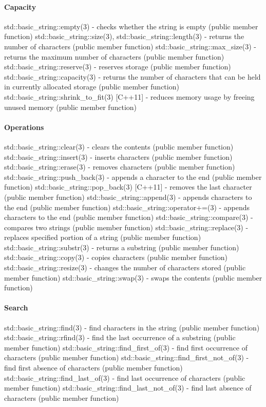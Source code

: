 \paragraph{Capacity}
std::basic\_string::empty(3) - checks whether the string is empty   (public member function)
std::basic\_string::size(3), std::basic\_string::length(3) - returns the number of characters   (public member function)
std::basic\_string::max\_size(3) - returns the maximum number of characters   (public member function)
std::basic\_string::reserve(3) - reserves storage   (public member function)
std::basic\_string::capacity(3) - returns the number of characters that can be held in currently allocated storage   (public member function)
std::basic\_string::shrink\_to\_fit(3) [C++11] - reduces memory usage by freeing unused memory   (public member function)
\paragraph{Operations}
std::basic\_string::clear(3) - clears the contents  (public member function)
std::basic\_string::insert(3) - inserts characters  (public member function)
std::basic\_string::erase(3) - removes characters   (public member function)
std::basic\_string::push\_back(3) - appends a character to the end  (public member function)
std::basic\_string::pop\_back(3) [C++11] - removes the last character   (public member function)
std::basic\_string::append(3) - appends characters to the end  (public member function)
std::basic\_string::operator+=(3) - appends characters to the end  (public member function)
std::basic\_string::compare(3) - compares two strings  (public member function)
std::basic\_string::replace(3) - replaces specified portion of a string  (public member function)
std::basic\_string::substr(3) - returns a substring  (public member function)
std::basic\_string::copy(3) - copies characters  (public member function)
std::basic\_string::resize(3) - changes the number of characters stored   (public member function)
std::basic\_string::swap(3) - swaps the contents   (public member function)
\paragraph{Search}
std::basic\_string::find(3) - find characters in the string  (public member function)
std::basic\_string::rfind(3) - find the last occurrence of a substring  (public member function)
std::basic\_string::find\_first\_of(3) - find first occurrence of characters  (public member function)
std::basic\_string::find\_first\_not\_of(3) - find first absence of characters  (public member function)
std::basic\_string::find\_last\_of(3) - find last occurrence of characters  (public member function)
std::basic\_string::find\_last\_not\_of(3) - find last absence of characters  (public member function)

